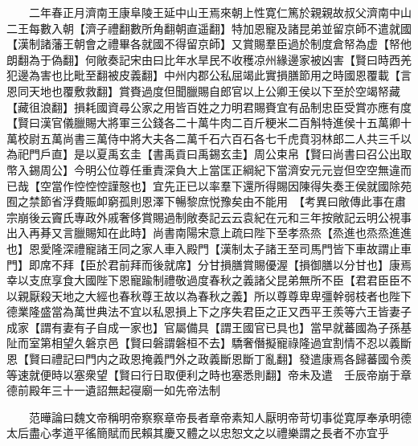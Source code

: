 　　二年春正月濟南王康阜陵王延中山王焉來朝上性寛仁篤於親親故叔父濟南中山二王每數入朝【濟子禮翻數所角翻朝直遥翻】特加恩寵及諸昆弟並留京師不遣就國【漢制諸藩王朝會之禮畢各就國不得留京師】又賞賜羣臣過於制度倉帑為虚【帑他朗翻為于偽翻】何敞奏記宋由曰比年水旱民不收穫凉州緣邊家被凶害【賢曰時西羌犯邊為害也比毗至翻被皮義翻】中州内郡公私屈竭此實損膳節用之時國恩覆載【言恩同天地也覆敷救翻】賞賚過度但聞臘賜自郎官以上公卿王侯以下至於空竭帑藏【藏徂浪翻】損耗國資尋公家之用皆百姓之力明君賜賚宜有品制忠臣受賞亦應有度【賢曰漢官儀臘賜大將軍三公錢各二十萬牛肉二百斤粳米二百斛特進侯十五萬卿十萬校尉五萬尚書三萬侍中將大夫各二萬千石六百石各七千虎賁羽林郎二人共三千以為祀門戶直】是以夏禹玄圭【書禹貢曰禹錫玄圭】周公束帛【賢曰尚書曰召公出取幣入錫周公】今明公位尊任重責深負大上當匡正綱紀下當濟安元元豈但空空無違而已哉【空當作悾悾悾謹慤也】宜先正已以率羣下還所得賜因陳得失奏王侯就國除苑囿之禁節省浮費賑卹窮孤則恩澤下暢黎庶悦豫矣由不能用　【考異曰敞傳此事在肅宗崩後云竇氏專政外戚奢侈賞賜過制敞奏記云云袁紀在元和三年按敞記云明公視事出入再朞又言臘賜知在此時】尚書南陽宋意上疏曰陛下至孝烝烝【烝進也烝烝進進也】恩愛隆深禮寵諸王同之家人車入殿門【漢制太子諸王至司馬門皆下車故謂止車門】即席不拜【臣於君前拜而後就席】分甘損膳賞賜優渥【損御膳以分甘也】康焉幸以支庶享食大國陛下恩寵踰制禮敬過度春秋之義諸父昆弟無所不臣【君君臣臣不以親厭殺天地之大經也春秋尊王故以為春秋之義】所以尊尊卑卑彊幹弱枝者也陛下德業隆盛當為萬世典法不宜以私恩損上下之序失君臣之正又西平王羨等六王皆妻子成家【謂有妻有子自成一家也】官屬備具【謂王國官已具也】當早就蕃國為子孫基阯而室第相望久磐京邑【賢曰磐謂磐桓不去】驕奢僭擬寵祿隆過宜割情不忍以義斷恩【賢曰禮記曰門内之政恩掩義門外之政義斷恩斷丁亂翻】發遣康焉各歸蕃國令羨等速就便時以塞衆望【賢曰行日取便利之時也塞悉則翻】帝未及遣　壬辰帝崩于章德前殿年三十一遺詔無起寑廟一如先帝法制

　　范曄論曰魏文帝稱明帝察察章帝長者章帝素知人厭明帝苛切事從寛厚奉承明德太后盡心孝道平徭簡賦而民賴其慶又體之以忠恕文之以禮樂謂之長者不亦宜乎

